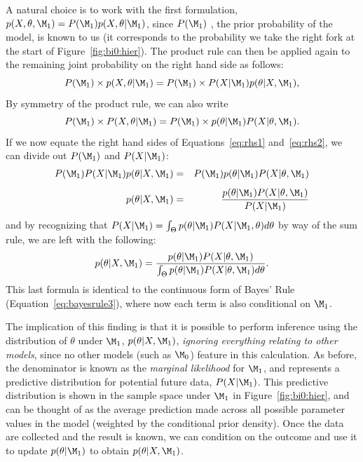 A natural choice is to work with the first formulation, $p(X,\theta,\M_1)=P(\M_1)p(X,\theta|\M_1)$, since $P(\M_1)$%
, the prior probability of the model,  
is known to us (it corresponds to the probability we take the right fork at the start of Figure~\ref{fig:bi0:hier}). The product rule can then be applied again to the remaining joint probability on the right hand side as follows: 
\begin{equation}\label{eq:rhs1}
P(\M_1) \times p(X,\theta|\M_1) = P(\M_1) \times P(X|\M_1)p(\theta|X,\M_1),
\end{equation}
By symmetry of the product rule, we can also write 
\begin{equation}\label{eq:rhs2}P(\M_1) \times P(X,\theta|\M_1) = P(\M_1) \times p(\theta|\M_1)P(X|\theta,\M_1).\end{equation}
If we now equate the right hand sides of Equations~\ref{eq:rhs1} and~\ref{eq:rhs2}, we can divide out $P(\M_1)$ and $P(X|\M_1)$:
\begin{eqnarray*}
P(\M_1)P(X|\M_1)p(\theta|X,\M_1) &=& P(\M_1)p(\theta|\M_1)P(X|\theta,\M_1)\\[1ex]
p(\theta|X,\M_1) &=& \frac{p(\theta|\M_1)P(X|\theta,\M_1)}{P(X|\M_1)}
\end{eqnarray*}
and by recognizing that ${P(X|\M_1)=\int_\Theta p(\theta|\M_1)P(X|\M_1,\theta)d\theta}$ by way of the sum rule, we are left with the following:
\begin{equation}\label{eq:MCpost}
p(\theta|X,\M_1) = \dfrac{p(\theta|\M_1)P(X|\theta,\M_1)}{\int_\Theta p(\theta|\M_1)P(X|\theta,\M_1)d\theta}.
\end{equation}
This last formula is identical to the continuous form of Bayes' Rule (Equation~\ref{eq:bayesrule3}), where now each term is also conditional on $\M_1$.

The implication of this finding is that it is possible to perform inference using the distribution of $\theta$ under $\M_1$, $p(\theta|X,\M_1)$, \emph{ignoring everything relating to other models}, since no other models (such as $\M_0$) feature in this calculation. As before, the denominator is known as the \textit{marginal likelihood} for $\M_1$, and represents a predictive distribution for potential future data, $P(X|\M_1)$. This predictive distribution is shown in the sample space under $\M_1$ in Figure~\ref{fig:bi0:hier}, and can be thought of as the average prediction made across all possible parameter values in the model (weighted by the conditional prior density). Once the data are collected and the result is known, we can condition on the outcome and use it to update $p(\theta|\M_1)$ to obtain $p(\theta|X,\M_1)$. 


